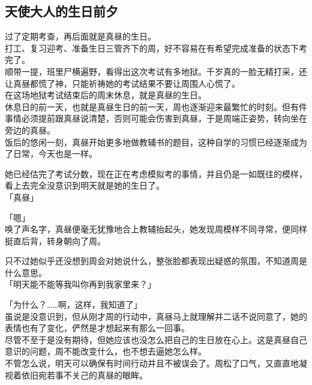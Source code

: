 \subsection{天使大人的生日前夕}

过了定期考查，再后面就是真昼的生日。\\

打工、复习迎考、准备生日三管齐下的周，好不容易在有希望完成准备的状态下考完了。\\

顺带一提，班里尸横遍野，看得出这次考试有多地狱。千岁真的一脸无精打采，还让真昼都慌了神，只能祈祷她的考试结果不要让周围人心慌了。\\

在这场地狱考试结束后的周末休息，就是真昼的生日。\\

休息日的前一天，也就是真昼生日的前一天，周也逐渐迎来最繁忙的时刻。但有件事情必须提前跟真昼说清楚，否则可能会伤害到真昼，于是周端正姿势，转向坐在旁边的真昼。\\

饭后的悠闲一刻，真昼开始更多地做教辅书的题目，这种自学的习惯已经逐渐成为了日常，今天也是一样。

她已经估完了考试分数，现在正在考虑模拟考的事情，并且仍是一如既往的模样，看上去完全没意识到明天就是她的生日了。\\

「真昼」

「嗯」\\

唤了声名字，真昼便毫无犹豫地合上教辅抬起头，她发现周模样不同寻常，便同样挺直后背，转身朝向了周。

只不过她似乎还没想到周会对她说什么，整张脸都表现出疑惑的氛围，不知道周是什么意思。\\

「明天能不能等我叫你再到我家里来？」

「为什么？……啊，这样，我知道了」\\

虽说是没意识到，但从刚才周的行动中，真昼马上就理解并二话不说同意了，她的表情也有了变化，俨然是才想起来有那么一回事。\\

尽管不至于是没有期待，但她应该也没怎么把自己的生日放在心上。这是真昼自己意识的问题，周不能改变什么，也不想去逼她怎么样。\\

不管怎么说，明天可以确保有时间行动并且不被误会了。周松了口气，又直直地凝视着依旧宛若事不关己的真昼的眼眸。\\


